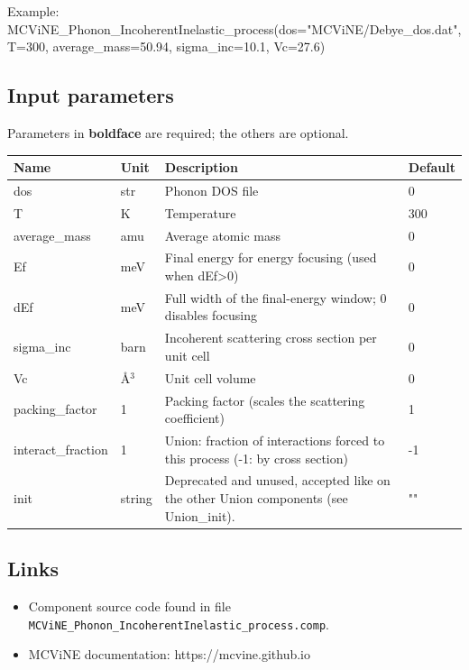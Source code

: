 Example: MCViNE\_Phonon\_IncoherentInelastic\_process(dos="MCViNE/Debye\_dos.dat", T=300, average\_mass=50.94, sigma\_inc=10.1, Vc=27.6)

\subsection*{Input parameters}
Parameters in \textbf{boldface} are required; the others are optional.

\begin{longtable}{p{}p{}p{}p{}}
\toprule
\textbf{Name} & \textbf{Unit} & \textbf{Description} & \textbf{Default} \\
\midrule
\endhead
dos & str & Phonon DOS file & 0 \\
T & K & Temperature & 300 \\
average\_mass & amu & Average atomic mass & 0 \\
Ef & meV & Final energy for energy focusing (used when dEf\textgreater{}0) & 0 \\
dEf & meV & Full width of the final-energy window; 0 disables focusing & 0 \\
sigma\_inc & barn & Incoherent scattering cross section per unit cell & 0 \\
Vc & \AA{}$^{3}$ & Unit cell volume & 0 \\
packing\_factor & 1 & Packing factor (scales the scattering coefficient) & 1 \\
interact\_fraction & 1 & Union: fraction of interactions forced to this process (-1: by cross section) & -1 \\
init & string & Deprecated and unused, accepted like on the other Union components (see Union\_init). & "" \\
\bottomrule
\end{longtable}

\subsection*{Links}
\begin{itemize}
  \item Component source code found in file \texttt{MCViNE\_Phonon\_IncoherentInelastic\_process.comp}.
  \item MCViNE documentation: https://mcvine.github.io
\end{itemize}
